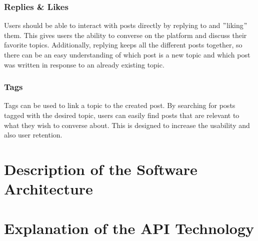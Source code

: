 \documentclass[a4paper, 11pt]{article}
\begin{document}
    \subsubsection{Replies \& Likes}
    Users should be able to interact with posts directly by replying to and \("\)liking\("\) them. This gives users the ability to converse on the platform and discuss their favorite topics. Additionally, replying keeps all the different posts together, so there can be an easy understanding of which post is a new topic and which post was written in response to an already existing topic.

    \subsubsection{Tags}
    Tags can be used to link a topic to the created post. By searching for posts tagged with the desired topic, users can easily find posts that are relevant to what they wish to converse about. This is designed to increase the usability and also user retention.




    \section{Description of the Software Architecture}\label{sec:description-of-the-software-architecture}



    \section{Explanation of the API Technology}\label{sec:explanation-of-the-api-technology}
\end{document}
